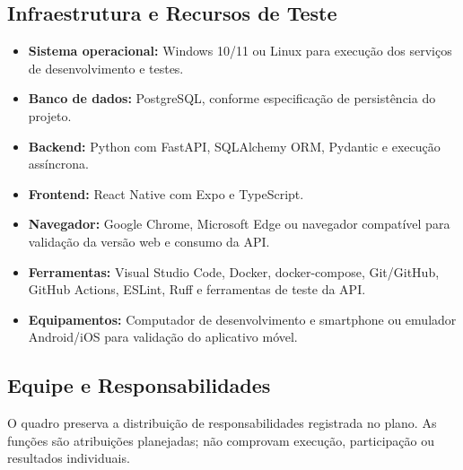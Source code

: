 \subsection{Infraestrutura e Recursos de Teste} %

\begin{itemize}
    \item \textbf{Sistema operacional:} Windows 10/11 ou Linux para execução dos serviços de desenvolvimento e testes.
    \item \textbf{Banco de dados:} PostgreSQL, conforme especificação de persistência do projeto.
    \item \textbf{Backend:} Python com FastAPI, SQLAlchemy ORM, Pydantic e execução assíncrona.
    \item \textbf{Frontend:} React Native com Expo e TypeScript.
    \item \textbf{Navegador:} Google Chrome, Microsoft Edge ou navegador compatível para validação da versão web e consumo da API.
    \item \textbf{Ferramentas:} Visual Studio Code, Docker, docker-compose, Git/GitHub, GitHub Actions, ESLint, Ruff e ferramentas de teste da API.
    \item \textbf{Equipamentos:} Computador de desenvolvimento e smartphone ou emulador Android/iOS para validação do aplicativo móvel.
\end{itemize}

\subsection{Equipe e Responsabilidades} %

O quadro preserva a distribuição de responsabilidades registrada no plano. As funções são atribuições planejadas; não comprovam execução, participação ou resultados individuais.

